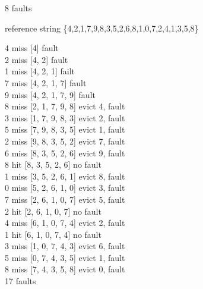 \documentclass{assignment}
\begin{document}
8 faults

reference string \{4,2,1,7,9,8,3,5,2,6,8,1,0,7,2,4,1,3,5,8\}

4 miss [4] fault \\
2 miss [4, 2] fault \\
1 miss [4, 2, 1] failt \\
7 miss [4, 2, 1, 7] fault \\
9 miss [4, 2, 1, 7, 9] fault \\
8 miss [2, 1, 7, 9, 8] evict 4, fault \\
3 miss [1, 7, 9, 8, 3] evict 2, fault \\
5 miss [7, 9, 8, 3, 5] evict 1, fault \\
2 miss [9, 8, 3, 5, 2] evict 7, fault \\
6 miss [8, 3, 5, 2, 6] evict 9, fault \\
8 hit [8, 3, 5, 2, 6] no fault \\
1 miss [3, 5, 2, 6, 1] evict 8, fault \\
0 miss [5, 2, 6, 1, 0] evict 3, fault \\
7 miss [2, 6, 1, 0, 7] evict 5, fault \\
2 hit [2, 6, 1, 0, 7] no fault \\
4 miss [6, 1, 0, 7, 4] evict 2, fault \\
1 hit [6, 1, 0, 7, 4] no fault \\
3 miss [1, 0, 7, 4, 3] evict 6, fault \\
5 miss [0, 7, 4, 3, 5] evict 1, fault \\
8 miss [7, 4, 3, 5, 8] evict 0, fault \\
17 faults 
\end{document}
